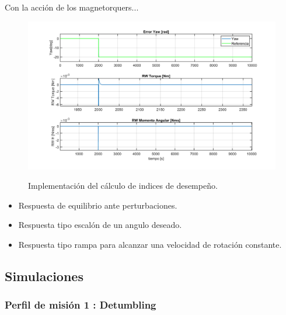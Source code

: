 Con la acción de los magnetorquers...


\begin{figure}[!h]
	\begin{center}
		\includegraphics[scale=0.55]{imagenes/resultados/Desaturation2.PNG}\\
	\end{center}
	\caption{Implementación del cálculo de indices de desempeño.}
	\label{fig:desaturacion}	 	
\end{figure}


\newpage


\begin{itemize}
	\item Respuesta de equilibrio ante perturbaciones. 
	\item Respuesta tipo escalón de un angulo deseado.
	\item Respuesta tipo rampa para alcanzar una velocidad de rotación constante.
\end{itemize} 

%
\subsection{Simulaciones}
\subsubsection{Perfil de misión 1 : Detumbling}




